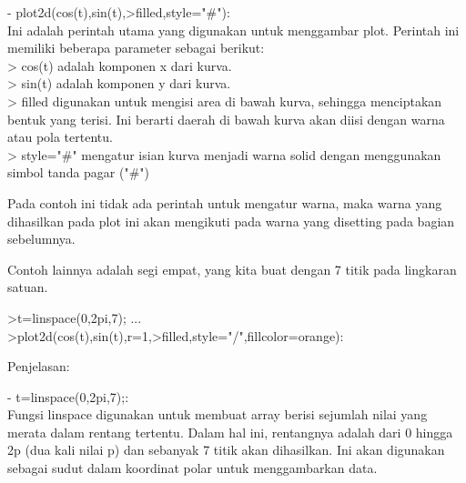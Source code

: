 \documentclass[a4paper,10pt]{article}
\begin{document}
\begin{eulernotebook}
\begin{eulercomment}
\begin{eulercomment}
\begin{eulercomment}
\begin{eulercomment}
\begin{eulercomment}
\begin{eulercomment}
\begin{eulercomment}
\begin{eulercomment}
\begin{eulercomment}
\begin{eulercomment}
\begin{eulercomment}
\begin{eulercomment}
\begin{eulercomment}
- plot2d(cos(t),sin(t),\textgreater{}filled,style="#"):\\
Ini adalah perintah utama yang digunakan untuk menggambar plot.
Perintah ini memiliki beberapa parameter sebagai berikut:\\
\textgreater{} cos(t) adalah komponen x dari kurva.\\
\textgreater{} sin(t) adalah komponen y dari kurva.\\
\textgreater{} filled digunakan untuk mengisi area di bawah kurva, sehingga
menciptakan bentuk yang terisi. Ini berarti daerah di bawah kurva akan
diisi dengan warna atau pola tertentu.\\
\textgreater{} style="#" mengatur isian kurva menjadi warna solid dengan
menggunakan simbol tanda pagar ("#")

Pada contoh ini tidak ada perintah untuk mengatur warna, maka warna
yang dihasilkan pada plot ini akan mengikuti pada warna yang disetting
pada bagian sebelumnya.

\end{eulercomment}
\begin{eulercomment}
Contoh lainnya adalah segi empat, yang kita buat dengan 7 titik pada
lingkaran satuan.
\end{eulercomment}
\begin{eulerprompt}
>t=linspace(0,2pi,7);  ...
>plot2d(cos(t),sin(t),r=1,>filled,style="/",fillcolor=orange):
\end{eulerprompt}
\begin{eulercomment}
Penjelasan:

- t=linspace(0,2pi,7);:\\
Fungsi linspace digunakan untuk membuat array berisi sejumlah nilai
yang merata dalam rentang tertentu. Dalam hal ini, rentangnya adalah
dari 0 hingga 2p (dua kali nilai p) dan sebanyak 7 titik akan
dihasilkan. Ini akan digunakan sebagai sudut dalam koordinat polar
untuk menggambarkan data.


\end{eulercomment}
\end{eulercomment}
\end{eulercomment}
\end{eulercomment}
\end{eulercomment}
\end{eulercomment}
\end{eulercomment}
\end{eulercomment}
\end{eulercomment}
\end{eulercomment}
\end{eulercomment}
\end{eulercomment}
\end{eulercomment}
\end{eulernotebook}
\end{document}

